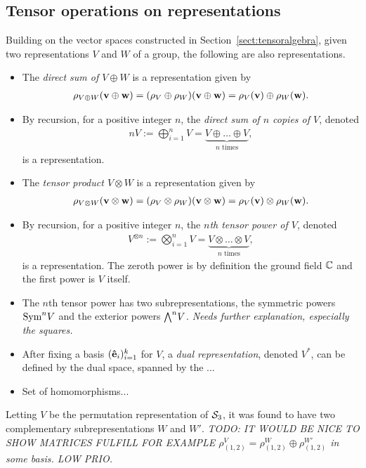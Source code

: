 \subsection{Tensor operations on representations}\label{sect:tensorrepr}

Building on the vector spaces constructed in Section~\ref{sect:tensoralgebra}, given two representations $V$ and $W$ of a group, the following are also representations.

\begin{itemize}
	\item The \emph{direct sum of $V \oplus W$} is a representation given by 
	\begin{align*}
		\rho_{V \oplus W}(\mathbf{v} \oplus \mathbf{w}) = (\rho_V \oplus \rho_W)(\mathbf{v} \oplus \mathbf{w}) = \rho_V(\mathbf{v}) \oplus \rho_W(\mathbf{w}).
	\end{align*}
	
	\item By recursion, for a positive integer $n$, the \emph{direct sum of $n$ copies of $V$}, denoted
	\begin{align*}
		nV := \bigoplus_{i=1}^n V = \underset{\text{$n$ times}}{\underbrace{V \oplus \dots \oplus V}},
	\end{align*}
	is a representation.
	
	\item The \emph{tensor product $V \otimes W$} is a representation given by
	\begin{align*}
		\rho_{V \otimes W}(\mathbf{v} \otimes \mathbf{w}) = (\rho_V \otimes \rho_W)(\mathbf{v} \otimes \mathbf{w}) = \rho_V(\mathbf{v}) \otimes \rho_W(\mathbf{w}).
	\end{align*}
	
	\item By recursion, for a positive integer $n$, the \emph{$n$th tensor power of $V$}, denoted
	\begin{align*}
		V^{\otimes n} := \bigotimes_{i=1}^n V = \underset{\text{$n$ times}}{\underbrace{V \otimes \dots \otimes V}},
	\end{align*}
	is a representation. The zeroth power is by definition the ground field $\mathbb{C}$ and the first power is $V$ itself.
	
	\item The $n$th tensor power has two subrepresentations, the symmetric powers $\text{Sym}^n V$ and the exterior powers ${\bigwedge}^n V$. \textit{Needs further explanation, especially the squares.}
	
	\item After fixing a basis $(\mathbf{\hat{e}}_i)_{i=1}^k$ for $V$, a \emph{dual representation}, denoted $V^*$, can be defined by the dual space, spanned by the ...
	
	\item Set of homomorphisms...
\end{itemize}


\begin{example}
	Letting $V$ be the permutation representation of $\mathcal{S}_3$, it was found to have two complementary subrepresentations $W$ and $W'$. \textit{TODO: IT WOULD BE NICE TO SHOW MATRICES FULFILL FOR EXAMPLE $\rho_{(1,2)}^V = \rho_{(1,2)}^W \oplus \rho_{(1,2)}^{W'}$ in some basis. LOW PRIO.}
\end{example}